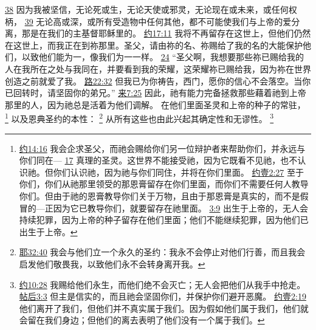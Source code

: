 \documentclass[12pt, a4paper, oneside]{ctexart}
\begin{document}
{		\href{https://biblehub.com/romans/8-38.htm}{38} 因为我被坚信，无论死或生，无论天使或邪灵，无论现在或未来，或任何权柄，
		\href{https://biblehub.com/romans/8-39.htm}{39} 无论高或深，或所有受造物中任何其他，都不可能使我们与上帝的爱分离，那是在我们的主基督耶稣里的。
		\href{https://biblehub.com/john/17-11.htm}{约17:11} 我将不再留存在这世上，但他们仍然在这世上，而我正在到祢那里。圣父，请由祢的名、祢赐给了我的名的大能保护他们，以致他们能为一，像我们为一一样。
		\href{https://biblehub.com/john/17-24.htm}{24} “圣父啊，我想要那些祢已赐给我的人在我所在之处与我同在，并要看到我的荣耀，这荣耀祢已赐给我，因为祢在世界创造之前就爱了我。
		\href{https://biblehub.com/luke/22-32.htm}{路22:32} 但我已为你祷告，西门，愿你的信心不会落空。当你已回转时，请坚固你的弟兄。”
		\href{https://biblehub.com/hebrews/7-25.htm}{来7:25} 因此，祂有能力完备拯救那些藉着祂到上帝那里的人，因为祂总是活着为他们调解。
	}
	在他们里面圣灵和上帝的种子的常驻，
	\footnote {
		\href{https://biblehub.com/john/14-16.htm}{约14:16} 我会企求圣父，而祂会赐给你们另一位辩护者来帮助你们，并永远与你们同在---
		\href{https://biblehub.com/john/14-17.htm}{17} 真理的圣灵。这世界不能接受祂，因为它既看不见祂，也不认识祂。但你们认识祂，因为祂与你们同住，并将在你们里面。
		\href{https://biblehub.com/1_john/2-27.htm}{约壹2:27} 至于你们，你们从祂那里领受的那恩膏留存在你们里面，而你们不需要任何人教导你们。但由于祂的恩膏教导你们关于万物，且由于那恩膏是真实的，而不是假冒的---正因为它已教导你们，就要留存在祂里面。
		\href{https://biblehub.com/1_john/3-9.htm}{3:9} 出生于上帝的，无人会持续犯罪，因为上帝的种子留存在他们里面；他们不能继续犯罪，因为他们已出生于上帝。
	}
	以及恩典圣约的本性：
	\footnote {
		\href{https://biblehub.com/jeremiah/32-40.htm}{耶32:40} 我会与他们立一个永久的圣约：我永不会停止对他们行善，而且我会启发他们敬畏我，以致他们永不会转身离开我。
	}
	从所有这些也由此兴起其确定性和无谬性。
	\footnote {
		\href{https://biblehub.com/john/10-28.htm}{约10:28} 我赐给他们永生，而他们绝不会灭亡；无人会把他们从我手中抢走。
		\href{https://biblehub.com/2_thessalonians/3-3.htm}{帖后3:3} 但主是信实的，而且祂会坚固你们，并保护你们避开恶魔。
		\href{https://biblehub.com/1_john/2-19.htm}{约壹2:19} 他们离开了我们，但他们并不真实属于我们。因为假如他们属于我们，他们就会留在我们身边；但他们的离去表明了他们没有一个属于我们。
	}
\end{document}
